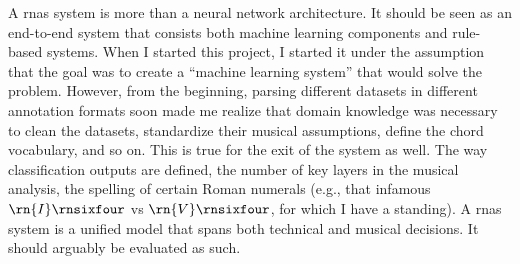 
A \glspl{rna} system is more than a neural network
architecture. It should be seen as an end-to-end system that
consists both machine learning components and rule-based
systems. When I started this project, I started it under the
assumption that the goal was to create a ``machine learning
system'' that would solve the problem. However, from the
beginning, parsing different datasets in different
annotation formats soon made me realize that domain
knowledge was necessary to clean the datasets, standardize
their musical assumptions, define the chord vocabulary, and
so on. This is true for the exit of the system as well. The
way classification outputs are defined, the number of key
layers in the musical analysis, the spelling of certain
Roman numerals (e.g., that infamous $\rn{I}\rnsixfour$ vs
$\rn{V}\rnsixfour$, for which I have a standing). A
\glspl{rna} system is a unified model that spans both
technical and musical decisions. It should arguably be
evaluated as such.

